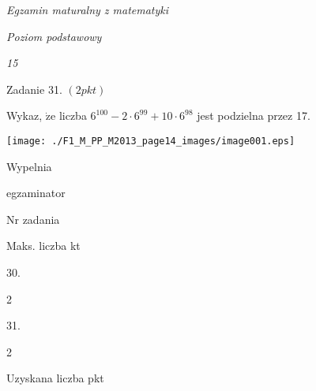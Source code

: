 \documentclass[a4paper,12pt]{article}
\begin{document}
{\it Egzamin maturalny z matematyki}

{\it Poziom podstawowy}

{\it 15}

Zadanie 31. $(2pkt)$

Wykaz, $\dot{\mathrm{z}}\mathrm{e}$ liczba $6^{100}-2\cdot 6^{99}+10\cdot 6^{98}$ jest podzielna przez 17.
\begin{center}
\texttt{[image: ./F1\_M\_PP\_M2013\_page14\_images/image001.eps]}
\end{center}
Wypelnia

egzaminator

Nr zadania

Maks. liczba kt

30.

2

31.

2

Uzyskana liczba pkt
\end{document}
